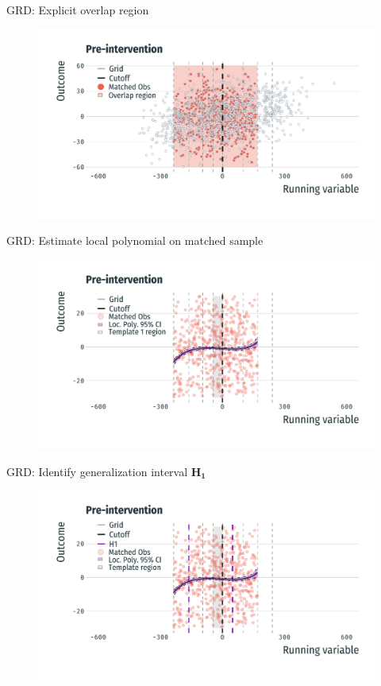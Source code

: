 \documentclass[usenames,dvipsnames,11pt,aspectratio=169]{beamer}
\begin{document}
\begin{frame}{GRD: Explicit overlap region}
\begin{figure}[!htb]
\centering
   \includegraphics[width=\textwidth]{figures/pre6.pdf}
\end{figure}
\end{frame}

\begin{frame}{GRD: Estimate local polynomial on matched sample}
\begin{figure}[!htb]
\centering
   \includegraphics[width=\textwidth]{figures/pre7.pdf}
\end{figure}
\end{frame}

\begin{frame}{GRD: Identify generalization interval $\mathbf{H_1}$}
\begin{figure}[!htb]
\centering
   \includegraphics[width=\textwidth]{figures/pre8.pdf}
\end{figure}
\end{frame}
\end{document}
